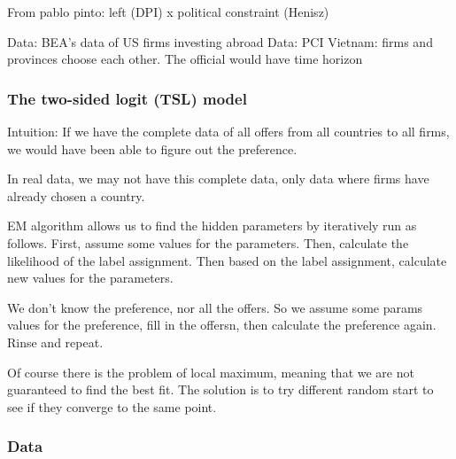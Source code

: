 From pablo pinto: left (DPI) x political constraint (Henisz) 

Data: BEA's data of US firms investing abroad
Data: PCI Vietnam: firms and provinces choose each other. The official would have time horizon

\subsubsection{The two-sided logit (TSL) model}

Intuition: If we have the complete data of all offers from all countries to all firms, we would have been able to figure out the preference.

In real data, we may not have this complete data, only data where firms have already chosen a country.

EM algorithm allows us to find the hidden parameters by iteratively run as follows. First, assume some values for the parameters. Then, calculate the likelihood of the label assignment. Then based on the label assignment, calculate new values for the parameters.

We don't know the preference, nor all the offers. So we assume some params values for the preference, fill in the offersn, then calculate the preference again. Rinse and repeat.

Of course there is the problem of local maximum, meaning that we are not guaranteed to find the best fit. The solution is to try different random start to see if they converge to the same point.

\subsubsection{Data}